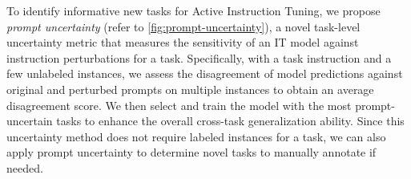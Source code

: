 To identify informative new tasks for Active Instruction Tuning, we propose \textit{prompt uncertainty} (refer to \autoref{fig:prompt-uncertainty}), a novel task-level uncertainty metric that %
measures the sensitivity of an IT model against instruction perturbations for a task. 
Specifically, with a task instruction and a few unlabeled instances, we assess the disagreement of model predictions against original and perturbed prompts on multiple instances to obtain an average disagreement score.
We then select and train the model with the most prompt-uncertain tasks to enhance the overall cross-task generalization ability. 
Since this uncertainty method does not require labeled instances for a task, we can also apply prompt uncertainty to determine novel tasks to manually annotate if needed. %

